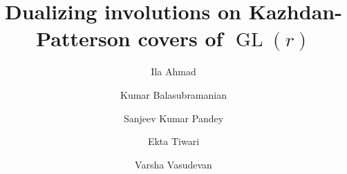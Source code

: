 \documentclass[11pt, a4paper, reqno]{amsart}
\theoremstyle{definition}
\theoremstyle{remark}
\theoremstyle{example}
\theoremstyle{note}
\numberwithin{equation}{section}
\DeclareMathOperator{\GL}{GL}
\begin{document}
\title{ Dualizing involutions on Kazhdan-Patterson covers of $\GL(r)$}


\author{Ila Ahmad} 
\address{Ila Ahmad\\
Department of Mathematics\\
IISER Bhopal\\
Bhopal, Madhya Pradesh 462066, India}

\author{Kumar Balasubramanian} %

\address{Kumar Balasubramanian\\
Department of Mathematics\\
IISER Bhopal\\
Bhopal, Madhya Pradesh 462066, India}

\author{Sanjeev Kumar Pandey} 
\address{Sanjeev Kumar Pandey\\
Department of Mathematics\\
IISER Bhopal\\
Bhopal, Madhya Pradesh 462066, India}

\author{Ekta Tiwari} 
\address{Ekta Tiwari\\
Department of Mathematics\\
IISER Pune\\
Pune, Maharashtra 411008, India}


\author{Varsha Vasudevan} 
\address{Varsha Vasudevan\\
Department of Mathematics\\
IISER Bhopal\\
Bhopal, Madhya Pradesh 462066, India}




\maketitle
\end{document}
